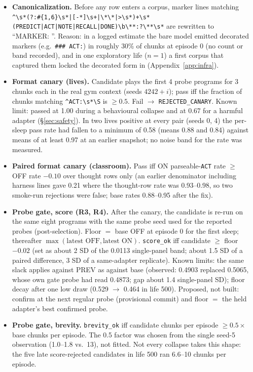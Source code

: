 \documentclass{article}
\begin{document}
\begin{itemize}
\item \textbf{Canonicalization.} Before any row enters a corpus, marker lines matching \verb!^\s*(?:#{1,6}\s*|[-*]\s+|\*\*|>\s*)+\s*(PREDICT|ACT|NOTE|RECALL|DONE)\b\**:?\**\s*! are rewritten to ``MARKER: ''. Reason: in a logged estimate the bare model emitted decorated markers (e.g.\ \texttt{\#\#\# ACT:}) in roughly 30\% of chunks at episode 0 (no count or band recorded), and in one exploratory life ($n = 1$) a first corpus that captured them locked the decorated form in (Appendix~\ref{app:infra}).
\item \textbf{Format canary (lives).} Candidate plays the first 4 probe programs for 3 chunks each in the real gym context (seeds $4242+i$); pass iff the fraction of chunks matching \verb|^ACT:\s*\S| is $\ge 0.5$. Fail $\to$ \texttt{REJECTED\_CANARY}. Known limit: passed at 1.00 during a behavioural collapse and at 0.67 for a harmful adapter (\S\ref{sec:safety}). In two lives positive at every pair (seeds 0, 4) the per-sleep pass rate had fallen to a minimum of 0.58 (means 0.88 and 0.84) against means of at least 0.97 at an earlier snapshot; no noise band for the rate was measured.
\item \textbf{Paired format canary (classroom).} Pass iff ON parseable-\texttt{ACT} rate $\ge$ OFF rate $-0.10$ over thought rows only (an earlier denominator including harness lines gave 0.21 where the thought-row rate was 0.93--0.98, so two smoke-run rejections were false; base rates 0.88--0.95 after the fix).
\item \textbf{Probe gate, score (R3, R4).} After the canary, the candidate is re-run on the same eight programs with the same probe seed used for the reported probes (post-selection). Floor $=$ base OFF at episode 0 for the first sleep; thereafter $\max(\text{latest OFF}, \text{latest ON})$. \texttt{score\_ok} iff candidate $\ge$ floor $-0.02$ (set as about 2 SD of the 0.0113 single-panel band; about 1.5 SD of a paired difference, 3 SD of a same-adapter replicate). Known limits: the same slack applies against PREV as against base (observed: 0.4903 replaced 0.5065, whose own gate probe had read 0.4873; gap about 1.4 single-panel SD); floor decay after one low draw (0.529 $\to$ 0.464 in life 500). Proposed, not built: confirm at the next regular probe (provisional commit) and floor $=$ the held adapter's best confirmed probe.
\item \textbf{Probe gate, brevity.} \texttt{brevity\_ok} iff candidate chunks per episode $\ge 0.5 \times$ base chunks per episode. The 0.5 factor was chosen from the single seed-5 observation (1.0--1.8 vs.\ 13), not fitted. Not every collapse takes this shape: the five late score-rejected candidates in life 500 ran 6.6--10 chunks per episode.

\end{itemize}
\end{document}
